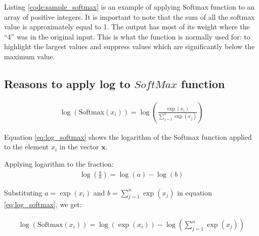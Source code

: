 Listing \ref{code:sample_softmax} is an example of applying Softmax function to an array of positive integers. It is important to note that the sum of all the softmax value is approximately equal to 1.  The output has most of its weight where the ``4'' was in the original input. This is what the function is normally used for: to highlight the largest values and suppress values which are significantly below the maximum value.



\subsection*{Reasons to apply log to $SoftMax$ function} \label{sec:Logsoft}

 
\begin{align}
    \log(\text{Softmax}(x_i)) = \log\left(\frac{{\exp(x_i)}}{{\sum_{j=1}^n \exp(x_j)}}\right) \label{eq:log_softmax}
\end{align}

Equation \eqref{eq:log_softmax} shows the logarithm of the Softmax function applied to the element \(x_i\) in the vector \(\mathbf{x}\). 

Applying logarithm to the fraction: 
\begin{align}
    \log\left(\frac{a}{b}\right) = \log(a) - \log(b)
\end{align}

Substituting \(a = \exp(x_i)\) and \(b = \sum_{j=1}^n \exp(x_j)\) in equation \eqref{eq:log_softmax}, we get:

\begin{align}
    \log(\text{Softmax}(x_i)) = \log(\exp(x_i)) - \log\left(\sum_{j=1}^n \exp(x_j)\right)
\end{align}

